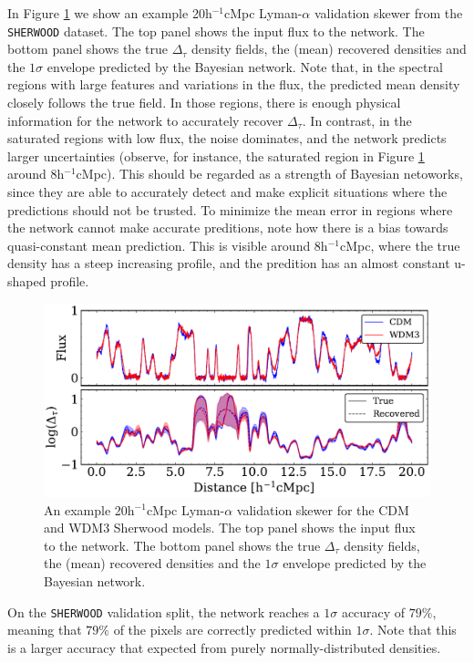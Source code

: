 In Figure \ref{fig: example_recovered_skewer} we show an example 20h$^{-1}$cMpc  Lyman-$\alpha$ validation skewer from the \texttt{SHERWOOD} dataset. The top panel shows the input flux to the network. The bottom panel shows the true $\Delta_\tau$ density fields, the (mean) recovered densities and the $1\sigma$ envelope predicted by the Bayesian network. Note that, in the spectral regions with large features and variations in the flux, the predicted mean density closely follows the true field. In those regions, there is enough physical information for the network to accurately recover $\Delta_\tau$. In contrast, in the saturated regions with low flux, the noise dominates, and the network predicts larger uncertainties (observe, for instance, the saturated region in Figure \ref{fig: example_recovered_skewer} around 8h$^{-1}$cMpc). This should be regarded as a strength of Bayesian netoworks, since they are able to accurately detect and make explicit situations where the predictions should not be trusted. To minimize the mean error in regions where the network cannot make accurate preditions, note how there is a bias towards quasi-constant mean prediction. This is visible around 8h$^{-1}$cMpc, where the true density has a steep increasing profile, and the predition has an almost constant u-shaped profile.

\begin{figure}
    \centering
    \includegraphics[width=0.99\linewidth]{img/ML/skewer.pdf}
    \caption{An example 20h$^{-1}$cMpc Lyman-$\alpha$ validation skewer for the CDM and WDM3 Sherwood models. The top panel shows the input flux to the network. The bottom panel shows the true $\Delta_\tau$ density fields, the (mean) recovered densities and the $1\sigma$ envelope predicted by the Bayesian network.}
    \label{fig: example_recovered_skewer}
\end{figure}
On the \texttt{SHERWOOD} validation split, the network reaches a $1\sigma$ accuracy of $79\%$, meaning that $79\%$ of the pixels are correctly predicted within $1\sigma$. Note that this is a larger accuracy that expected from purely normally-distributed densities.




